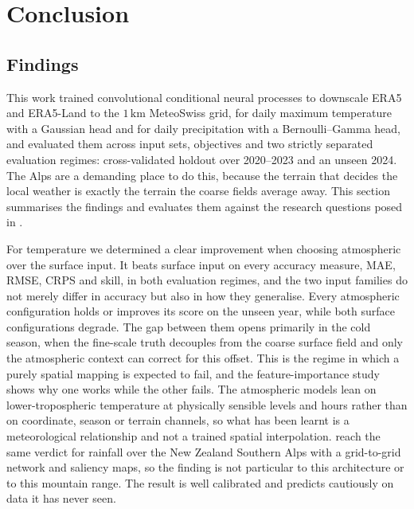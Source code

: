 \chapter{Conclusion}\label{ch:conclusion}

\section{Findings}\label{sec:concl-findings}

This work trained convolutional conditional neural processes to downscale ERA5 and ERA5-Land to the
$1\,\mathrm{km}$ MeteoSwiss grid, for daily maximum temperature with a Gaussian head and for daily
precipitation with a Bernoulli--Gamma head, and evaluated them across input sets, objectives and
two strictly separated evaluation regimes: cross-validated holdout over 2020--2023 and an unseen
2024. The Alps are a demanding place to do this, because the terrain that decides the local weather
is exactly the terrain the coarse fields average away. This section summarises the findings and
evaluates them against the research questions posed in .

For temperature we determined a clear  improvement when choosing atmospheric over the surface input. It beats surface
input on every accuracy measure, MAE, RMSE, CRPS and skill, in both evaluation regimes, and the two input
families do not merely differ in accuracy but also in how they generalise. Every atmospheric
configuration holds or improves its score on the unseen year, while both surface
configurations degrade. The gap between them opens primarily in the cold season, when the
fine-scale truth decouples from the coarse surface field and only the atmospheric context can
correct for this offset. This is the regime in which a purely spatial mapping is expected to fail,
and the feature-importance study shows why one works while the other fails. The atmospheric models lean on lower-tropospheric
temperature at physically sensible levels and hours rather than on coordinate, season or terrain
channels, so what has been learnt is a meteorological relationship and not a trained spatial
interpolation. \textcite{rampal2022interpretable} reach the same verdict for rainfall over the
New Zealand Southern Alps with a grid-to-grid network and saliency maps, so the finding is not
particular to this architecture or to this mountain range. The result is well calibrated and predicts cautiously on data it has never seen.


